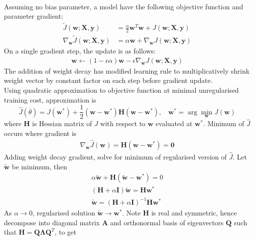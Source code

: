 \begin{remark} \\
Assuming no bias parameter, a model have the following objective function and parameter gradient:
\begin{align*}
\tilde{J}(\bm{w}; \bm{X}, \bm{y}) &= \frac{\alpha}{2} \bm{w}^T \bm{w} + J(\bm{w}; \bm{X}, \bm{y}) \nonumber \\
\nabla_{\bm{w}} \tilde{J}(\bm{w}; \bm{X}, \bm{y}) &= \alpha \bm{w} + \nabla_{\bm{w}} J(\bm{w}; \bm{X}, \bm{y}) \nonumber
\end{align*}
On a single gradient step, the update is as follows:
\begin{align*}
\bm{w} \leftarrow (1 - \epsilon \alpha)\bm{w} - \epsilon \nabla_{\bm{w}} J(\bm{w}; \bm{X}, \bm{y}) \nonumber
\end{align*}
The addition of weight decay has modified learning rule to multiplicatively shrink weight vector by constant factor on each step before gradient update.\\
Using quadratic approximation to objective function at minimal unregularised training cost, approximation is
\begin{equation*}
\hat{J}(\overline{\theta}) = J(\bm{w}^*) + \frac{1}{2} (\bm{w} - \bm{w}^*)\bm{H}(\bm{w} - \bm{w}^*), \ \ \ \ \bm{w}^* = \arg \min_{\bm{w}} J(\bm{w}) \nonumber
\end{equation*}
where $\bm{H}$ is Hessian matrix of $J$ with respect to $\bm{w}$ evaluated at $\bm{w}^*$. Minimum of $\hat{J}$ occurs where gradient is
\begin{align}
\nabla_{\bm{w}} \hat{J}(\bm{w}) = \bm{H}(\bm{w} - \bm{w}^*) = \bm{0} \nonumber
\end{align}
Adding weight decay gradient, solve for minimum of regularised version of $\hat{J}$. Let $\tilde{\bm{w}}$ be minimum, then
\begin{align}
\alpha \tilde{\bm{w}} + \bm{H}(\tilde{\bm{w}} - \bm{w}^*) = 0 \nonumber \\
(\bm{H} + \alpha \bm{I})\tilde{\bm{w}} = \bm{H} \bm{w}^* \nonumber \\
\tilde{\bm{w}} = (\bm{H} + \alpha \bm{I})^{-1} \bm{H} \bm{w}^* \nonumber
\end{align}
As $\alpha \rightarrow 0$, regularised solution $\tilde{\bm{w}} \rightarrow \bm{w}^*$. Note $\bm{H}$ is real and symmetric, hence decompose into diagonal matrix $\bm{A}$ and orthonormal basis of eigenvectors $\bm{Q}$ such that $\bm{H} = \bm{Q} \bm{\Lambda} \bm{Q}^T$, to get

\end{remark}
